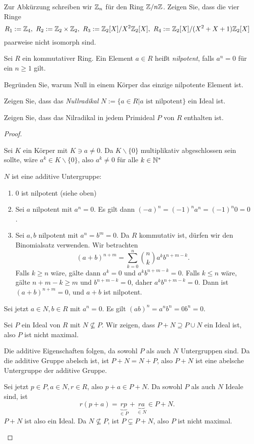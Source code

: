 \begin{Problem}
	Zur Abkürzung schreiben wir $\mathbb{Z}_n$ f\"{u}r den Ring $\mathbb{Z} / n\mathbb{Z}$. Zeigen Sie, dass die vier Ringe
	\[
		R_1:=\mathbb{Z}_4,~R_2:=\mathbb{Z}_2\times \mathbb{Z}_2,~R_3:=\mathbb{Z}_2[X] / X^2 \mathbb{Z}_2[X],~R_4:=\mathbb{Z}_2[X] / (X^2+X+1)\mathbb{Z}_2[X]
	\]
	paarweise nicht isomorph sind.
\end{Problem}

\begin{Problem}
	Sei $R$ ein kommutativer Ring. Ein Element $a\in R$ heißt \emph{nilpotent}, falls $a^n=0$ f\"{u}r ein $n\ge 1$ gilt.
	\begin{parts}
	\item Begründen Sie, warum Null in einem Körper das einzige nilpotente Element ist.
	\item Zeigen Sie, dass das \emph{Nullradikal} $N:=\{a\in R|a\text{ ist nilpotent}\} $ ein Ideal ist.
	\item Zeigen Sie, dass das Nilradikal in jedem Primideal $P$ von $R$ enthalten ist.
	\end{parts}
\end{Problem}
\begin{proof}
	\begin{parts}
	\item Sei $K$ ein Körper mit $K\ni a\neq 0$. Da $K \backslash\{0\} $ multiplikativ abgeschlossen sein sollte, wäre $a^k\in K \backslash \{0\} $, also  $a^k\neq 0$ f\"{u}r alle $k\in \mathbb{N}^*$
	\item $N$ ist eine additive Untergruppe:
		\begin{enumerate}[label=(\roman*)]
			\item $0$ ist nilpotent (siehe oben)
			\item Sei $a$ nilpotent mit $a^n=0$. Es gilt dann $(-a)^n=(-1)^n a^n=(-1)^n 0=0$.
			\item Sei $a,b$ nilpotent mit $a^n=b^m=0$. Da $R$ kommutativ ist, dürfen wir den Binomialsatz verwenden. Wir betrachten
				\[
					(a+b)^{n+m}=\sum_{k=0}^n \binom{n}{k} a^k b^{n+m-k}
				.\]
				Falls $k\ge n$ wäre, gälte dann $a^k=0$ und $a^k b^{n+m-k}=0$. Falls $k\le n$ wäre, gälte $n+m-k\ge m$ und $b^{n+m-k}=0$, daher $a^k b^{n+m-k}=0$. Dann ist $(a+b)^{n+m}=0$, und $a+b$ ist nilpotent.
		\end{enumerate}
		Sei jetzt $a\in N,b\in R$ mit $a^n=0$. Es gilt $(ab)^n=a^nb^n=0b^n=0$.
	\item Sei $P$ ein Ideal von $R$ mit $N\not\subseteq P$. Wir zeigen, dass $P+N\supseteq P\cup N$ ein Ideal ist, also $P$ ist nicht maximal. 

		Die additive Eigenschaften folgen, da sowohl $P$ als auch $N$ Untergruppen sind. Da die additive Gruppe abelsch ist, ist $P+N=N+P$, also $P+N$ ist eine abelsche Untergruppe der additive Gruppe.

		Sei jetzt $p\in P, a\in N,r\in R$, also $p+a\in P+N$. Da sowohl $P$ als auch $N$ Ideale sind, ist
		\[
			r(p+a)=\underbrace{rp}_{\in P}+\underbrace{ra}_{\in N}\in P+N
		.\] 
		$P+N$ ist also ein Ideal. Da $N\not\subseteq P$, ist $P\subsetneq P+N$, also $P$ ist nicht maximal.\qedhere
	\end{parts}
\end{proof}
